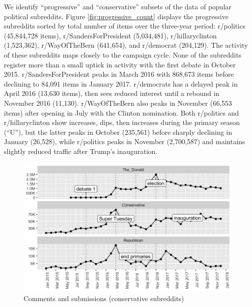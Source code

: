 \documentclass[doublespacing]{utdthesis}
\begin{document}
We identify ``progressive'' and ``conservative'' subsets of the data of popular political subreddits.
Figure \ref{fig:progressive_count} displays the progressive subreddits sorted by total number of items over the three-year period: r/politics (45,844,728 items), r/SandersForPresident (5,034,481), r/hillaryclinton (1,523,362), r/WayOfTheBern (641,654), and r/democrat (204,129).
The activity of these subreddits maps closely to the campaign cycle.
None of the subreddits register more than a small uptick in activity with the first debate in October 2015.
r/SandersForPresident peaks in March 2016 with 868,673 items before declining to 84,091 items in January 2017.
r/democrats has a delayed peak in April 2016 (13,630 items), then sees reduced interest until a rebound in November 2016 (11,130). 
r/WayOfTheBern also peaks in November (66,553 items) after opening in July with the Clinton nomination.
Both r/politics and r/hillaryclinton show increases, dips, then increases during the primary season (``U''), but the latter peaks in October (235,561) before sharply declining in January (26,528), while r/politics peaks in November (2,700,587) and maintains slightly reduced traffic after Trump's inauguration. 

\begin{figure}[!ht]
\centering
\includegraphics[width=\textwidth]{2016/conservative_count}
\caption{Comments and submissions (conservative subreddits)}
\label{fig:conservative_count}
\end{figure}
\end{document}
